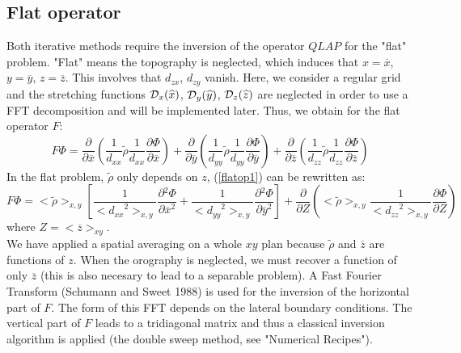 \subsection{Flat operator}
\par Both iterative methods require the inversion of the operator $QLAP$ for
the "flat" problem. "Flat" means the topography is neglected, which induces
that $x=\overline{x}$, $y=\overline{y}$, $z=\overline{z}$.
This involves that $d_{zx}$, $d_{zy}$ vanish. Here, we consider a regular grid
and the stretching functions ${\cal{D}}_x (\widehat{x})$,
${\cal{D}}_y (\widehat{y})$, ${\cal{D}}_z (\widehat{z})$ are neglected
in order to use a FFT decomposition and will be implemented later. Thus, we
obtain for the flat operator $F$:\\
\begin{equation}
\label{flatop1}
F \Phi =  \frac { \partial{} } { \partial{\overline{x}} } \left(
          \dfrac{1}{d_{xx}} \tilde{\rho} \dfrac{1}{d_{xx}}
          \frac { \partial{\Phi} } { \partial{\overline{x}} } \right)
+          \frac { \partial{} } { \partial{\overline{y}} } \left(
          \dfrac{1}{d_{yy}} \tilde{\rho} \dfrac{1}{d_{yy}}
          \frac { \partial{\Phi} } { \partial{\overline{y}} } \right)
+          \frac { \partial{} } { \partial{\overline{z}} } \left(
          \dfrac{1}{d_{zz}} \tilde{\rho} \dfrac{1}{d_{zz}}
          \frac { \partial{\Phi} } { \partial{\overline{z}} } \right)
\end{equation}
In the flat problem, $\tilde{\rho}$ only depends on $z$, (\ref{flatop1})
can be rewritten as:\\
\begin{equation}
\label{flatop}
F \Phi =  < \tilde{\rho}>_{x,y}
  \left[ \dfrac{1}{<{d_{xx}}^2>_{x,y}}
         \frac { \partial{^2\Phi} } { \partial{\overline{x}^2} }
+        \dfrac{1}{<{d_{yy}}^2>_{x,y}}
         \frac { \partial{^2\Phi} } { \partial{\overline{y}^2} }
  \right]
+          \frac { \partial{} } { \partial{Z} } \left(
           <\tilde{\rho}>_{x,y} \dfrac{1} {<{d_{zz}}^2>_{x,y}}
          \frac { \partial{\Phi} } { \partial{Z} } \right)
\end{equation}
where $Z = <\overline{z}>_{xy}$.\\
We have applied a spatial averaging on a whole $xy$ plan because
$\tilde{\rho}$ and $\overline{z}$ are functions of $z$. When
the orography is neglected, we must recover a function of only $\overline{z}$ (this
is also necesary to lead to a separable problem). A Fast Fourier Transform
(Schumann and Sweet 1988) is used for the inversion of the
horizontal part of $F$. The form of this FFT depends on the lateral boundary
conditions. The vertical part of $F$ leads to a tridiagonal matrix and thus a
classical inversion algorithm is applied (the double sweep method, see
"Numerical Recipes").

